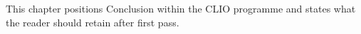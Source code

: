 This chapter positions Conclusion within the CLIO programme and states what the reader should retain after first pass.
